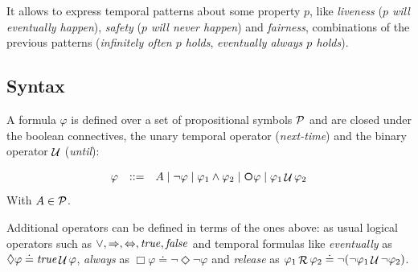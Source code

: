 It allows to express temporal patterns about some property $p$, like \emph{liveness} (\emph{$p$ will eventually happen}), \emph{safety} (\emph{$p$ will never happen}) and \emph{fairness}, combinations of the previous patterns (\emph{infinitely often $p$ holds}, \emph{eventually always $p$ holds}).

\subsection{Syntax}\label{sect:ltl-syntax}
A \LTL formula $\varphi$ is defined over a set of propositional symbols $\mathcal{P}$ and are closed under the boolean connectives, the unary temporal operator \Next (\emph{next-time}) and the binary operator $\mathop{\mathcal{U}}$ (\emph{until}):

\[\begin{array}{rcl}
\varphi &::=& A \mid \lnot \varphi \mid \varphi_1\land \varphi_2 \mid \Next\varphi \mid \varphi_1 \lUntil \varphi_2
\end{array}
\]
With $A\in \mathcal{P}$.

Additional operators can be defined in terms of the ones above: as usual logical operators such as $\vee, \Rightarrow, \Leftrightarrow, \mathit{true}, \mathit{false}$ and temporal formulas like \emph{eventually} as $\Diamond \varphi \doteq \mathit{true} \mathop{\mathcal{U}} \varphi$, \emph{always} as $\Box \varphi \doteq \lnot \Diamond \lnot \varphi$ and \emph{release} as $\varphi_1 \mathop{\mathcal{R}} \varphi_2 \doteq \lnot (\lnot \varphi_1 \mathop{\mathcal{U}} \lnot \varphi_2)$.

